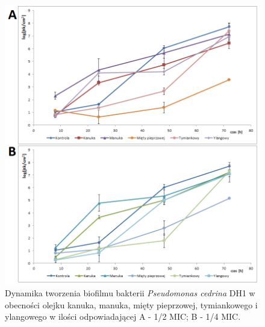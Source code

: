 \documentclass[11pt,a4paper]{report}
\begin{document}
\begin{figure}[!h]
\begin{center}
\includegraphics[scale=0.65]{img/dh1-b.png}
\caption{Dynamika tworzenia biofilmu bakterii \textit{Pseudomonas cedrina} DH1 w obecności olejku kanuka, manuka, mięty pieprzowej, tymiankowego i ylangowego w ilości odpowiadającej A - 1/2 MIC; B - 1/4 MIC.}\label{dh1-b}
\end{center} 
\end{figure}
\end{document}
